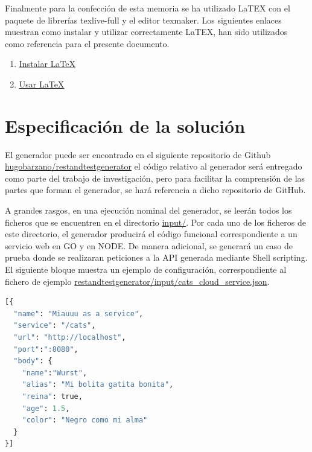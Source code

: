 \documentclass[a4paper,11pt]{book}
\begin{document}
Finalmente para la confección de esta memoria se ha utilizado LaTEX con el paquete de librerías texlive-full y el editor texmaker. Los siguientes enlaces muestran como instalar y utilizar correctamente LaTEX, han sido utilizados como referencia para el presente documento. 

\begin{enumerate}
\item \href{http://milq.github.io/install-latex-ubuntu-debian/}{Instalar LaTeX}
\item \href{ http://minisconlatex.blogspot.com.es/}{Usar LaTeX}
\end{enumerate}


\section{Especificación de la solución}

El generador puede ser encontrado en el siguiente repositorio de Github \href{ https://github.com/hugobarzano/restandtestgenerator}{hugobarzano/restandtestgenerator} el código relativo al generador será entregado como parte del trabajo de investigación, pero para facilitar la comprensión de las partes que forman el generador, se hará referencia a dicho repositorio de GitHub. 

A grandes rasgos, en una ejecución nominal del generador, se leerán todos los ficheros que se encuentren en el directorio  \href{https://github.com/hugobarzano/restandtestgenerator/tree/master/input}{input/}. Por cada uno de los ficheros de este directorio, el generador producirá el código funcional correspondiente a un servicio web en GO y en NODE. De manera adicional, se generará un caso de prueba donde se realizaran peticiones a la API generada mediante Shell scripting.  El siguiente bloque muestra un ejemplo de configuración, correspondiente al fichero de ejemplo  \href{https://github.com/hugobarzano/restandtestgenerator/blob/master/input/cats\_cloud\_service.json}{restandtestgenerator/input/cats\_cloud\_service.json}. 

\begin{lstlisting}[language=python,caption={ Ejemplo Entrada Generador }]
[{
  "name": "Miauuu as a service",
  "service": "/cats",
  "url": "http://localhost",
  "port":":8080",
  "body": {
    "name":"Wurst",
    "alias": "Mi bolita gatita bonita",
    "reina": true,
    "age": 1.5,
    "color": "Negro como mi alma"
  }
}]
\end{lstlisting}
\end{document}
